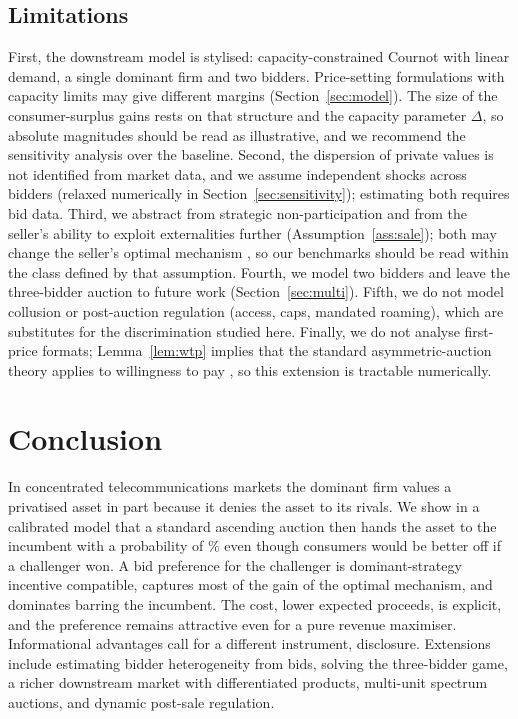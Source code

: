 \documentclass[12pt,a4paper]{article}
\theoremstyle{definition}
\theoremstyle{remark}
\begin{document}
\subsection{Limitations}\label{sec:limitations}

First, the downstream model is stylised: capacity-constrained Cournot with linear demand, a single dominant firm and two bidders. Price-setting formulations with capacity limits may give different margins (Section~\ref{sec:model}). The size of the consumer-surplus gains rests on that structure and the capacity parameter $\Delta$, so absolute magnitudes should be read as illustrative, and we recommend the sensitivity analysis over the baseline. Second, the dispersion of private values is not identified from market data, and we assume independent shocks across bidders (relaxed numerically in Section~\ref{sec:sensitivity}); estimating both requires bid data. Third, we abstract from strategic non-participation and from the seller's ability to exploit externalities further (Assumption~\ref{ass:sale}); both may change the seller's optimal mechanism \citep{jms1996}, so our benchmarks should be read within the class defined by that assumption. Fourth, we model two bidders and leave the three-bidder auction to future work (Section~\ref{sec:multi}). Fifth, we do not model collusion or post-auction regulation (access, caps, mandated roaming), which are substitutes for the discrimination studied here. Finally, we do not analyse first-price formats; Lemma~\ref{lem:wtp} implies that the standard asymmetric-auction theory applies to willingness to pay \citep{maskinriley2000,cantillon2008}, so this extension is tractable numerically.

\section{Conclusion}\label{sec:conclusion}

In concentrated telecommunications markets the dominant firm values a privatised asset in part because it denies the asset to its rivals. We show in a calibrated model that a standard ascending auction then hands the asset to the incumbent with a probability of \pDStd\% even though consumers would be better off if a challenger won. A bid preference for the challenger is dominant-strategy incentive compatible, captures most of the gain of the optimal mechanism, and dominates barring the incumbent. The cost, lower expected proceeds, is explicit, and the preference remains attractive even for a pure revenue maximiser. Informational advantages call for a different instrument, disclosure. Extensions include estimating bidder heterogeneity from bids, solving the three-bidder game, a richer downstream market with differentiated products, multi-unit spectrum auctions, and dynamic post-sale regulation.
\end{document}
